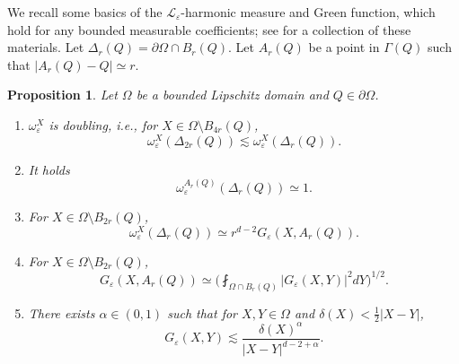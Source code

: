 \documentclass[reqno,12pt]{amsart} %
\newtheorem{proposition}[theorem]{Proposition}
\theoremstyle{definition}
\theoremstyle{remark}
\numberwithin{equation}{section}
\newcommand{\cL}{\mathcal{L}}
\newcommand{\e}{\varepsilon}
\newcommand{\red}[1]{\textcolor{red}{#1}}
\begin{document}
We recall some basics of the $\cL_\e$-harmonic measure and Green function, which hold for any bounded measurable coefficients; see \cite{K94} for a collection of these materials. 
Let $\Delta_r(Q) = \partial \Omega \cap B_r(Q)$. Let $A_r(Q)$ be a point in $\Gamma(Q)$ such that $|A_r(Q) - Q| \simeq r$.
\begin{proposition}\label{prop.hmBasics}
    Let $\Omega$ be a bounded Lipschitz domain and $Q\in \partial \Omega$.
    \begin{enumerate}[label=(\roman*)]
        \item \label{item.doubling}
        $\omega^X_\e$ is doubling, i.e., for $X\in \Omega \setminus B_{4r}(Q)$,
        \begin{equation}
            \omega^X_\e(\Delta_{2r}(Q)) \lesssim \omega^X_\e(\Delta_{r}(Q)).
        \end{equation}
        \item \label{item.w=1} It holds
        \begin{equation}
            \omega_\e^{A_r(Q)}(\Delta_{r}(Q)) \simeq 1.
        \end{equation}
        
        \item  \label{item.w=G}  
        For $X\in \Omega \setminus B_{2r}(Q)$, 
    \begin{equation}\label{est.w=G}
        \omega_\e^X(\Delta_r(Q)) \simeq r^{d-2} G_\e(X, A_r(Q)).
    \end{equation}
        \item \label{item.G-L2}
        For $X\in \Omega \setminus B_{2r}(Q)$,
    \begin{equation}
        G_\e(X, A_r(Q)) \simeq \bigg( \fint_{\Omega \cap B_r(Q)} |G_\e(X,Y)|^2 dY\bigg)^{1/2}.
    \end{equation}

    \item \label{item.G.Holder}
    There exists $\alpha \in (0,1)$ such that for $X,Y\in \Omega$ and $\delta(X) < \frac12 |X-Y|$, 
    \begin{equation}
        G_\e(X,Y) \lesssim \frac{\delta(X)^\alpha}{|X-Y|^{d-2+\alpha}}.
    \end{equation}
    \end{enumerate}
\end{proposition}

\end{document}
